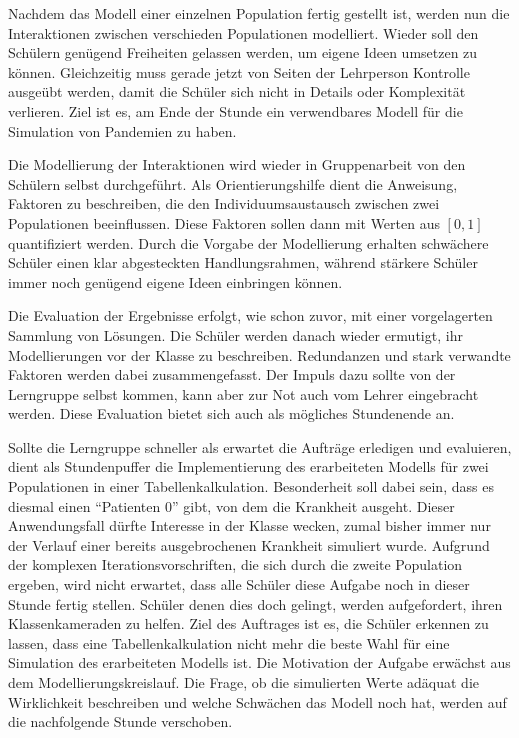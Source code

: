 Nachdem das Modell einer einzelnen Population fertig gestellt ist, werden nun die Interaktionen zwischen verschieden Populationen modelliert. Wieder soll den Schülern genügend Freiheiten gelassen werden, um eigene Ideen umsetzen zu können. Gleichzeitig muss gerade jetzt von Seiten der Lehrperson Kontrolle ausgeübt werden, damit die Schüler sich nicht in Details oder Komplexität verlieren. Ziel ist es, am Ende der Stunde ein verwendbares Modell für die Simulation von Pandemien zu haben. 

Die Modellierung der Interaktionen wird wieder in Gruppenarbeit von den Schülern selbst durchgeführt. Als Orientierungshilfe dient die Anweisung, Faktoren zu beschreiben, die den Individuumsaustausch zwischen zwei Populationen beeinflussen. Diese Faktoren sollen dann mit Werten aus $[0,1]$ quantifiziert werden. Durch die Vorgabe der Modellierung erhalten schwächere Schüler einen klar abgesteckten Handlungsrahmen, während stärkere Schüler immer noch genügend eigene Ideen einbringen können. 

Die Evaluation der Ergebnisse erfolgt, wie schon zuvor, mit einer vorgelagerten Sammlung von Lösungen. Die Schüler werden danach wieder ermutigt, ihr Modellierungen vor der Klasse zu beschreiben. Redundanzen und stark verwandte Faktoren werden dabei zusammengefasst. Der Impuls dazu sollte von der Lerngruppe selbst kommen, kann aber zur Not auch vom Lehrer eingebracht werden. Diese Evaluation bietet sich auch als mögliches Stundenende an. 

Sollte die Lerngruppe schneller als erwartet die Aufträge erledigen und evaluieren, dient als Stundenpuffer die Implementierung des erarbeiteten Modells für zwei Populationen in einer Tabellenkalkulation. Besonderheit soll dabei sein, dass es diesmal einen ``Patienten 0'' gibt, von dem die Krankheit ausgeht. Dieser Anwendungsfall dürfte Interesse in der Klasse wecken, zumal bisher immer nur der Verlauf einer bereits ausgebrochenen Krankheit simuliert wurde. Aufgrund der komplexen Iterationsvorschriften, die sich durch die zweite Population ergeben, wird nicht erwartet, dass alle Schüler diese Aufgabe noch in dieser Stunde fertig stellen. Schüler denen dies doch gelingt, werden aufgefordert, ihren Klassenkameraden zu helfen. Ziel des Auftrages ist es, die Schüler erkennen zu lassen, dass eine Tabellenkalkulation nicht mehr die beste Wahl für eine Simulation des erarbeiteten Modells ist. Die Motivation der Aufgabe erwächst aus dem Modellierungskreislauf. Die Frage, ob die simulierten Werte adäquat die Wirklichkeit beschreiben und welche Schwächen das Modell noch hat, werden auf die nachfolgende Stunde verschoben.

